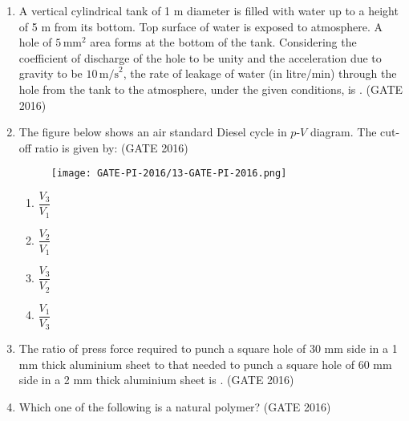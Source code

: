 \documentclass[journal,12pt,onecolumn]{IEEEtran}
\theoremstyle{remark}
\begin{document}
\begin{enumerate}
\vspace{1cm}

\item A vertical cylindrical tank of 1 m diameter is filled with water up to a height of 5 m from its bottom. 
Top surface of water is exposed to atmosphere. A hole of $5 \, \text{mm}^2$ area forms at the bottom of the tank. 
Considering the coefficient of discharge of the hole to be unity and the acceleration due to gravity to be $10 \, \text{m/s}^2$, 
the rate of leakage of water (in litre/min) through the hole from the tank to the atmosphere, under the given conditions, is \underline{\hspace{2cm}}.  \hfill{(GATE 2016)}

\vspace{1cm}


\newpage
\item The figure below shows an air standard Diesel cycle in $p$-$V$ diagram. 
The cut-off ratio is given by:  \hfill{(GATE 2016)}

\begin{figure}[H]
    \centering
    \texttt{[image: GATE-PI-2016/13-GATE-PI-2016.png]}
    \caption{}
    \label{q13}
\end{figure}

\begin{multicols}{4}
\begin{enumerate}
    \item $\dfrac{V_3}{V_1}$
    \item $\dfrac{V_2}{V_1}$
    \item $\dfrac{V_3}{V_2}$
    \item $\dfrac{V_1}{V_3}$
\end{enumerate}
\end{multicols}

\vspace{0.5cm}

\item The ratio of press force required to punch a square hole of 30 mm side in a 1 mm thick aluminium sheet 
to that needed to punch a square hole of 60 mm side in a 2 mm thick aluminium sheet is \underline{\hspace{2cm}}. \hfill{(GATE 2016)} 

\vspace{0.5cm}

\item Which one of the following is a natural polymer? \hfill{(GATE 2016)} 


\end{enumerate}
\end{document}
